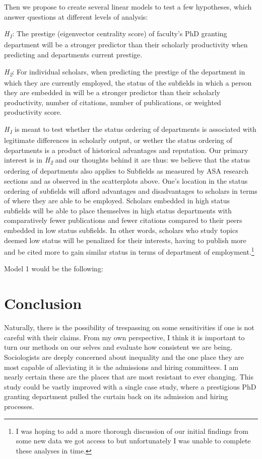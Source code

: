 \documentclass{article}
\begin{document}
Then we propose to create several linear models to test a few hypotheses, which answer questions at different levels of analysis:

\smallskip

\emph{H\textsubscript{1}}: The prestige (eigenvector centrality score) of faculty's PhD granting department will be a stronger predictor than their scholarly productivity when predicting and departments current prestige.

\emph{H\textsubscript{2}}: For individual scholars, when predicting the prestige of the department in which they are currently employed, the status of the subfields in which a person they are embedded in will be a stronger predictor than their scholarly productivity, number of citations, number of publications, or weighted productivity score.

\emph{H\textsubscript{1}} is meant to test whether the status ordering of departments is associated with legitimate differences in scholarly output, or wether the status ordering of departments is a product of historical advantages and reputation. Our primary interest is in \emph{H\textsubscript{2}} and our thoughts behind it are thus: we believe that the status ordering of departments also applies to Subfields as measured by ASA research sections and as observed in the scatterplots above. One's location in the status ordering of subfields will afford advantages and disadvantages to scholars in terms of where they are able to be employed. Scholars embedded in high status subfields will be able to place themselves in high status departments with comparatively fewer publications and fewer citations compared to their peers embedded in low status subfields. In other words, scholars who study topics deemed low status will be penalized for their interests, having to publish more and be cited more to gain similar status in terms of department of employment.\footnote{I was hoping to add a more thorough discussion of our initial findings from some new data we got access to but unfortunately I was unable to complete these analyses in time.}

Model 1 would be the following:


\section{Conclusion}

Naturally, there is the possibility of trespassing on some sensitivities if one is not careful with their claims. From my own perspective, I think it is important to turn our methods on our selves and evaluate how consistent we are being. Sociologists are deeply concerned about inequality and the one place they are most capable of alleviating it is the admissions and hiring committees. I am nearly certain these are the places that are most resistant to ever changing. This study could be vastly improved with a single case study, where a prestigious PhD granting department pulled the curtain back on its admission and hiring processes.
\end{document}

